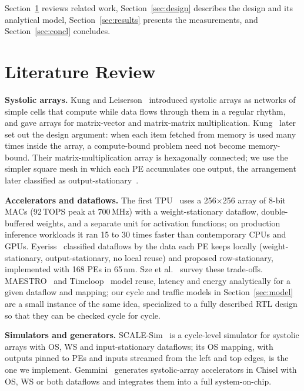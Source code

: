 \documentclass[conference]{IEEEtran}
\begin{document}
Section~\ref{sec:lit} reviews related work, Section~\ref{sec:design} describes the design and its analytical model, Section~\ref{sec:results} presents the measurements, and Section~\ref{sec:concl} concludes.

\section{Literature Review}
\label{sec:lit}

\textbf{Systolic arrays.} Kung and Leiserson~\cite{kunglei1978} introduced systolic arrays as networks of simple cells that compute while data flows through them in a regular rhythm, and gave arrays for matrix-vector and matrix-matrix multiplication. Kung~\cite{kung1982} later set out the design argument: when each item fetched from memory is used many times inside the array, a compute-bound problem need not become memory-bound. Their matrix-multiplication array is hexagonally connected; we use the simpler square mesh in which each PE accumulates one output, the arrangement later classified as output-stationary~\cite{chen2016}.

\textbf{Accelerators and dataflows.} The first TPU~\cite{jouppi2017} uses a 256$\times$256 array of 8-bit MACs (92\,TOPS peak at 700\,MHz) with a weight-stationary dataflow, double-buffered weights, and a separate unit for activation functions; on production inference workloads it ran 15 to 30 times faster than contemporary CPUs and GPUs. Eyeriss~\cite{chen2016,chen2017} classified dataflows by the data each PE keeps locally (weight-stationary, output-stationary, no local reuse) and proposed row-stationary, implemented with 168 PEs in 65\,nm. Sze et al.~\cite{sze2017} survey these trade-offs. MAESTRO~\cite{kwon2019} and Timeloop~\cite{parashar2019} model reuse, latency and energy analytically for a given dataflow and mapping; our cycle and traffic models in Section~\ref{sec:model} are a small instance of the same idea, specialized to a fully described RTL design so that they can be checked cycle for cycle.

\textbf{Simulators and generators.} SCALE-Sim~\cite{samajdar2018,samajdar2020} is a cycle-level simulator for systolic arrays with OS, WS and input-stationary dataflows; its OS mapping, with outputs pinned to PEs and inputs streamed from the left and top edges, is the one we implement. Gemmini~\cite{genc2021} generates systolic-array accelerators in Chisel with OS, WS or both dataflows and integrates them into a full system-on-chip.
\end{document}
